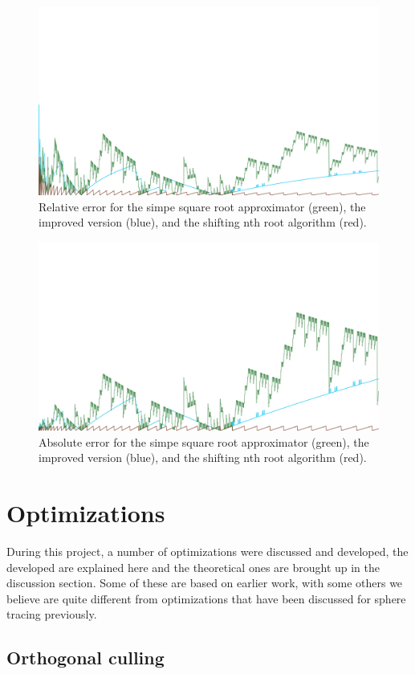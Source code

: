		\begin{figure}[H]
			\centering
			\includegraphics[width=0.75\linewidth]{figure/rel_error_480x.png} 
			\caption{Relative error for the simpe square root approximator
				(green), the improved version (blue), and the shifting nth root
				algorithm (red).}
			\label{orsqrt2}
		\end{figure}

		\begin{figure}[H]
			\centering
			\includegraphics[width=0.75\linewidth]{figure/abs_error_24x.png} 
			\caption{Absolute error for the simpe square root approximator
				(green), the improved version (blue), and the shifting nth root
				algorithm (red).}
			\label{orsqrt2}
		\end{figure}

	\section{Optimizations}
		
		During this project, a number of optimizations were discussed and
		developed, the developed are explained here and the theoretical ones
		are brought up in the discussion section. Some of these are based on
		earlier work, with some others we believe are quite different from
		optimizations that have been discussed for sphere tracing previously.

		\subsection{Orthogonal culling}

